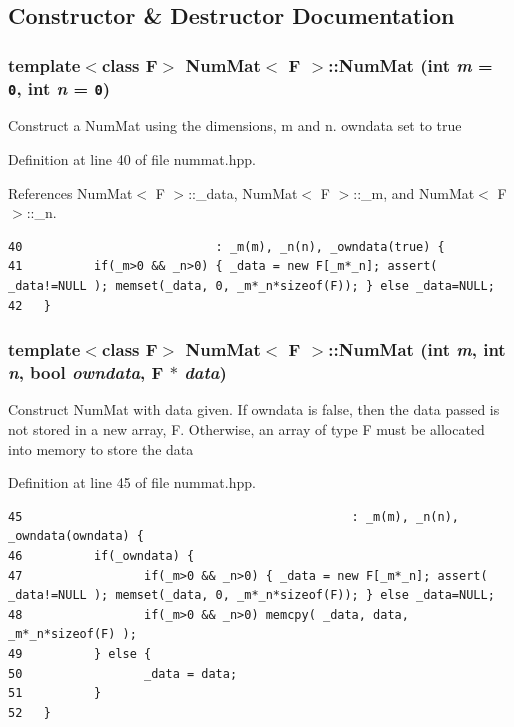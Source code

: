 \subsection{Constructor \& Destructor Documentation}
\subsubsection{\setlength{\rightskip}{0pt plus 5cm}template$<$class F$>$ {\bf Num\-Mat}$<$ F $>$::{\bf Num\-Mat} (int {\em m} = {\tt 0}, int {\em n} = {\tt 0})\hspace{0.3cm}{\tt  [inline]}}\label{classNumMat_dbf73e11c1ff70b095c6d97aa75ed610_dbf73e11c1ff70b095c6d97aa75ed610}


Construct a Num\-Mat using the dimensions, m and n. owndata set to true 

Definition at line 40 of file nummat.hpp.

References Num\-Mat$<$ F $>$::\_\-data, Num\-Mat$<$ F $>$::\_\-m, and Num\-Mat$<$ F $>$::\_\-n.

\footnotesize\begin{verbatim}40                           : _m(m), _n(n), _owndata(true) {
41          if(_m>0 && _n>0) { _data = new F[_m*_n]; assert( _data!=NULL ); memset(_data, 0, _m*_n*sizeof(F)); } else _data=NULL;
42   }
\end{verbatim}\normalsize 


\subsubsection{\setlength{\rightskip}{0pt plus 5cm}template$<$class F$>$ {\bf Num\-Mat}$<$ F $>$::{\bf Num\-Mat} (int {\em m}, int {\em n}, bool {\em owndata}, F $\ast$ {\em data})\hspace{0.3cm}{\tt  [inline]}}\label{classNumMat_b5da1f826a1fdb2179102482afe8981d_b5da1f826a1fdb2179102482afe8981d}


Construct Num\-Mat with data given. If owndata is false, then the data passed is not stored in a new array, F. Otherwise, an array of type F must be allocated into memory to store the data 

Definition at line 45 of file nummat.hpp.

\footnotesize\begin{verbatim}45                                              : _m(m), _n(n), _owndata(owndata) {
46          if(_owndata) {
47                 if(_m>0 && _n>0) { _data = new F[_m*_n]; assert( _data!=NULL ); memset(_data, 0, _m*_n*sizeof(F)); } else _data=NULL;
48                 if(_m>0 && _n>0) memcpy( _data, data, _m*_n*sizeof(F) );
49          } else {
50                 _data = data;
51          }
52   }
\end{verbatim}\normalsize 


